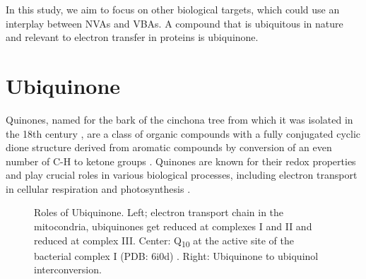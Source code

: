 In this study, we aim to focus on other biological targets, which could use an interplay between NVAs and VBAs. A compound that is ubiquitous in nature and relevant to electron transfer in proteins is ubiquinone.

\section{Ubiquinone}
Quinones, named for the bark of the cinchona tree from which it was isolated in the 18th century \cite{rusell1873quinone}, are a class of organic compounds with a fully conjugated cyclic dione structure derived from aromatic compounds by conversion of an even number of C-H to ketone groups \cite{IUPACQ050152025}. Quinones are known for their redox properties and play crucial roles in various biological processes, including electron transport in cellular respiration and photosynthesis \cite{ernster1995biochemical,chen2024low}.

\begin{figure}[ht!]
  \centering
  \caption[Role of ubiquinone]{Roles of Ubiquinone. Left; electron transport chain in the mitocondria, ubiquinones get reduced at complexes I and II and reduced at complex III. Center: Q\textsubscript{10} at the active site of the bacterial complex I (PDB: 6i0d) \cite{gutierrez2020key}. Right: Ubiquinone to ubiquinol interconversion.}
  \label{fig:ETC}
\end{figure}

